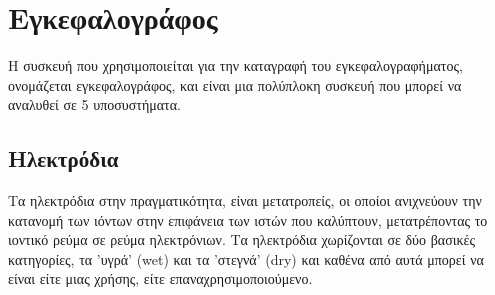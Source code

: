 \documentclass[11pt,a4paper,english,greek,twoside]{../Thesis}
\begin{document}
\section{Εγκεφαλογράφος}
Η συσκευή που χρησιμοποιείται για την καταγραφή του εγκεφαλογραφήματος, ονομάζεται εγκεφαλογράφος, και είναι μια πολύπλοκη συσκευή που μπορεί να αναλυθεί σε 5 υποσυστήματα.

\subsection{Ηλεκτρόδια}
Tα ηλεκτρόδια στην πραγματικότητα, είναι μετατροπείς, οι οποίοι ανιχνεύουν την κατανομή των ιόντων στην επιφάνεια των ιστών που καλύπτουν, μετατρέποντας το ιοντικό ρεύμα σε ρεύμα ηλεκτρόνιων. Τα ηλεκτρόδια χωρίζονται σε δύο βασικές κατηγορίες, τα 'υγρά' (wet) και τα 'στεγνά' (dry) και καθένα από αυτά μπορεί να είναι είτε μιας χρήσης, είτε επαναχρησιμοποιούμενο. 
\end{document}
